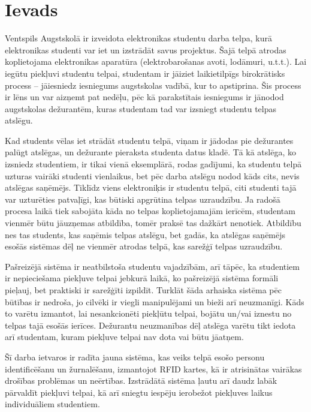 \chapter*{Ievads}


Ventspils Augstskolā ir izveidota elektronikas studentu darba telpa, kurā elektronikas studenti var iet un izstrādāt savus projektus. Šajā telpā atrodas koplietojama elektronikas aparatūra (elektrobarošanas avoti, lodāmuri, u.t.t.). Lai iegūtu piekļuvi studentu telpai, studentam ir jāiziet laikietilpīgs birokrātisks process -- jāiesniedz iesniegums augstskolas vadībā, kur to apstiprina. Šis process ir lēns un var aizņemt pat nedēļu, pēc kā parakstītais iesniegums ir jānodod augstskolas dežurantēm, kuras studentam tad var izsniegt studentu telpas atslēgu.

Kad students vēlas iet strādāt studentu telpā, viņam ir jādodas pie dežurantes palūgt atslēgas, un dežurante pieraksta studenta datus kladē. Tā kā atslēga, ko izsniedz studentiem, ir tikai vienā eksemplārā, rodas gadījumi, ka studentu telpā uzturas vairāki studenti vienlaikus, bet pēc darba atslēgu nodod kāds cits, nevis atslēgas saņēmējs. Tiklīdz viens elektroniķis ir studentu telpā, citi studenti tajā var uzturēties patvaļīgi, kas būtiski apgrūtina telpas uzraudzību. Ja radošā procesa laikā tiek sabojāta kāda no telpas koplietojamajām ierīcēm, studentam vienmēr būtu jāuzņemas atbildība, tomēr praksē tas dažkārt nenotiek. Atbildību nes tas students, kas saņēmis telpas atslēgu, bet gadās, ka atslēgas saņēmējs esošās sistēmas dēļ ne vienmēr atrodas telpā, kas sarežģī telpas uzraudzību.

Pašreizējā sistēma ir neatbilstoša studentu vajadzībām, arī tāpēc, ka studentiem ir nepieciešama piekļuve telpai jebkurā laikā, ko pašreizējā sistēma formāli pieļauj, bet praktiski ir sarežģīti izpildīt. Turklāt šāda arhaiska sistēma pēc būtības ir nedroša, jo cilvēki ir viegli manipulējami un bieži arī neuzmanīgi. Kāds to varētu izmantot, lai nesankcionēti piekļūtu telpai, bojātu un/vai iznestu no telpas tajā esošās ierīces. Dežurantu neuzmanības dēļ atslēga varētu tikt iedota arī studentam, kuram piekļuve telpai nav dota vai būtu jāatņem.

Šī darba ietvaros ir radīta jauna sistēma, kas veiks telpā esošo personu identificēšanu un žurnalēšanu, izmantojot RFID kartes, kā ir atrisinātas vairākas drošības problēmas un neērtības. Izstrādātā sistēma ļautu arī daudz labāk pārvaldīt piekļuvi telpai, kā arī sniegtu iespēju ierobežot piekļuves laikus individuāliem studentiem.

